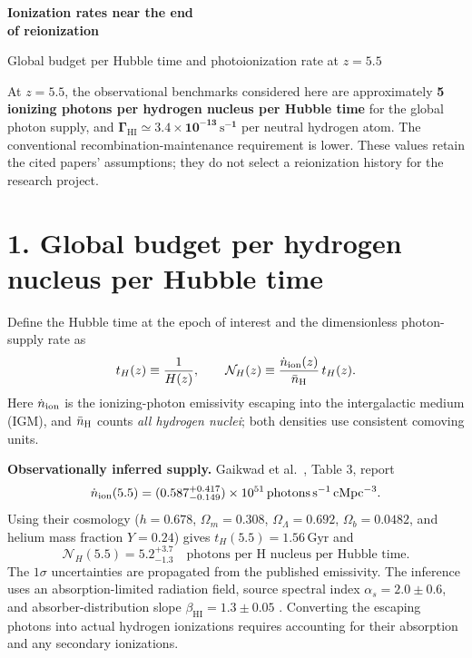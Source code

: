 \documentclass[11pt,a4paper]{article}
\newcommand{\Gyr}{\mathrm{Gyr}}
\newcommand{\HI}{\mathrm{HI}}
\begin{document}
\thispagestyle{plain}
{\LARGE\bfseries\textcolor{ink}{Ionization rates near the end\\[3pt] of reionization}}\par
{\large Global budget per Hubble time and photoionization rate at $z=5.5$}

At $z=5.5$, the observational benchmarks considered here are approximately
\textbf{5 ionizing photons per hydrogen nucleus per Hubble time} for the
global photon supply, and $\boldsymbol{\Gamma_{\HI}\simeq
3.4\times10^{-13}\,\mathrm{s}^{-1}}$ per neutral hydrogen atom.
The conventional recombination-maintenance requirement is lower.
These values retain the cited papers' assumptions; they do not select a
reionization history for the research project.

\section*{1. Global budget per hydrogen nucleus per Hubble time}
Define the Hubble time at the epoch of interest and the dimensionless
photon-supply rate as
\begin{equation}
 t_H(z)\equiv\frac{1}{H(z)},\qquad
 \mathcal N_H(z)\equiv
 \frac{\dot n_{\rm ion}(z)}{\bar n_{\rm H}}\,t_H(z).
\end{equation}
Here $\dot n_{\rm ion}$ is the ionizing-photon emissivity escaping into the
intergalactic medium (IGM), and $\bar n_{\rm H}$ counts \emph{all hydrogen
nuclei}; both densities use consistent comoving units.

\textbf{Observationally inferred supply.}
Gaikwad et al.\ \cite{Gaikwad2023}, Table 3, report
\begin{equation}
 \dot n_{\rm ion}(5.5)=
 (0.587^{+0.417}_{-0.149})\times10^{51}
 \,\mathrm{photons\,s^{-1}\,cMpc^{-3}}.
\end{equation}
Using their cosmology ($h=0.678$, $\Omega_m=0.308$,
$\Omega_\Lambda=0.692$, $\Omega_b=0.0482$, and helium mass fraction
$Y=0.24$) gives $t_H(5.5)=1.56\,\Gyr$ and
\begin{equation}
 \boxed{\mathcal N_H(5.5)=5.2^{+3.7}_{-1.3}
 \quad\text{photons per H nucleus per Hubble time}.}
\end{equation}
The $1\sigma$ uncertainties are propagated from the published emissivity.
The inference uses an absorption-limited radiation field, source spectral
index $\alpha_s=2.0\pm0.6$, and absorber-distribution slope
$\beta_{\HI}=1.3\pm0.05$ \cite[\S6.4]{Gaikwad2023}.
Converting the escaping photons into actual hydrogen ionizations requires
accounting for their absorption and any secondary ionizations.
\end{document}
